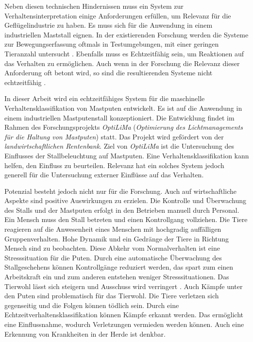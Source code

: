 Neben diesen technischen Hindernissen muss ein System zur Verhaltensinterpretation einige Anforderungen erfüllen, um Relevanz für die Geflügelindustrie zu haben. Es muss sich für die Anwendung in einem industriellen Maststall eignen. In der existierenden Forschung werden die Systeme zur Bewegungserfassung oftmals in Testumgebungen, mit einer geringen Tieranzahl untersucht \cite{Fang.2020, Ju.2021}. Ebenfalls muss es Echtzeitfähig sein, um Reaktionen auf das Verhalten zu ermöglichen. Auch wenn in der Forschung die Relevanz dieser Anforderung oft betont wird, so sind die resultierenden Systeme nicht echtzeitfähig \cite{Chen.2023, Nasirahmadi.2020}. \par

In dieser Arbeit wird ein echtzeitfähiges System für die maschinelle Verhaltensklassifikation von Mastputen entwickelt. Es ist auf die Anwendung in einem industriellen Mastputenstall konzeptioniert. Die Entwicklung findet im Rahmen des Forschungsprojekts \textit{\acrshort{OptiLiMa}} (\textit{Optimierung des Lichtmanagements für die Haltung von Mastputen}) statt. Das Projekt wird gefördert von der \textit{landwirtschaftlichen Rentenbank}. Ziel von \textit{\acrshort{OptiLiMa}} ist die Untersuchung des Einflusses der Stallbeleuchtung auf Mastputen. Eine Verhaltensklassifikation kann helfen, den Einfluss zu beurteilen. Relevanz hat ein solches System jedoch generell für die Untersuchung externer Einflüsse auf das Verhalten.\par

Potenzial besteht jedoch nicht nur für die Forschung. Auch auf wirtschaftliche Aspekte sind positive Auswirkungen zu erzielen. Die Kontrolle und Überwachung des Stalls und der Mastputen erfolgt in den Betrieben manuell durch Personal. Ein Mensch muss den Stall betreten und einen Kontrollgang vollziehen. Die Tiere reagieren auf die Anwesenheit eines Menschen mit hochgradig auffälligen Gruppenverhalten. Hohe Dynamik und ein Gedränge der Tiere in Richtung Mensch sind zu beobachten. Diese Abkehr vom Normalverhalten ist eine Stresssituation für die Puten. Durch eine automatische Überwachung des Stallgeschehens können Kontrollgänge reduziert werden, das spart zum einen Arbeitskraft ein und zum anderen entstehen weniger Stresssituationen. Das Tierwohl lässt sich steigern und Ausschuss wird verringert \cite{Chen.2023, Garcia.2020}. Auch Kämpfe unter den Puten sind problematisch für das Tierwohl. Die Tiere verletzen sich gegenseitig und die Folgen können tödlich sein. Durch eine Echtzeitverhaltensklassifikation können Kämpfe erkannt werden. Das ermöglicht eine Einflussnahme, wodurch Verletzungen vermieden werden können. Auch eine Erkennung von Krankheiten in der Herde ist denkbar.\par


